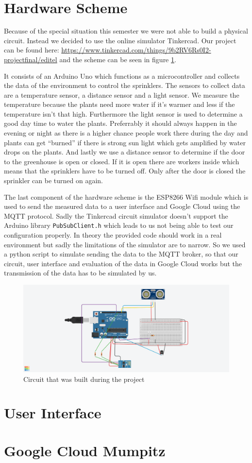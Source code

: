 \documentclass{article}
\begin{document}
\section{Hardware Scheme}
Because of the special situation this semester we were not able to build a physical circuit. Instead we decided to use the online simulator Tinkercad. Our project can be found here: \url{https://www.tinkercad.com/things/9b2RV6Rs0I2-projectfinal/editel} and the scheme can be seen in figure \ref{fig:scheme}.\par 
It consists of an Arduino Uno which functions as a microcontroller and collects the data of the environment to control the sprinklers. The sensors to collect data are a temperature sensor, a distance sensor and a light sensor. We measure the temperature because the plants need more water if it's warmer and less if the temperature isn't that high. Furthermore the light sensor is used to determine a good day time to water the plants. Preferrably it should always happen in the evening or night as there is a higher chance people work there during the day and plants can get \enquote{burned} if there is strong sun light which gets amplified by water drops on the plants. And lastly we use a distance sensor to determine if the door to the greenhouse is open or closed. If it is open there are workers inside which means that the sprinklers have to be turned off. Only after the door is closed the sprinkler can be turned on again.\par 
The last component of the hardware scheme is the ESP8266 Wifi module which is used to send the measured data to a user interface and Google Cloud using the MQTT protocol. Sadly the Tinkercad circuit simulator doesn't support the Arduino library \texttt{PubSubClient.h} which leads to us not being able to test our configuration properly. In theory the provided code should work in a real environment but sadly the limitations of the simulator are to narrow. So we used a python script to simulate sending the data to the MQTT broker, so that our circuit, user interface and evaluation of the data in Google Cloud works but the transmission of the data has to be simulated by us. 
\begin{figure}
	\hspace{-4cm}\includegraphics[scale=0.3]{scheme.png}
	\caption{Circuit that was built during the project}
	\label{fig:scheme}
\end{figure}

\section{User Interface}
\section{Google Cloud Mumpitz}
\end{document}
